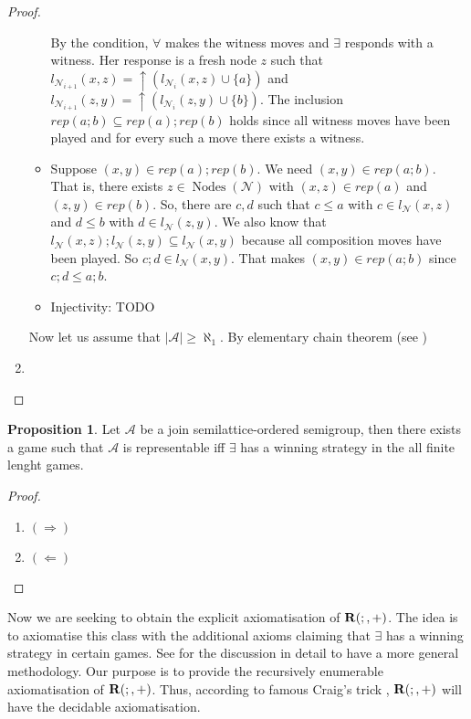 \documentclass[a4paper]{article}
\theoremstyle{definition}
\theoremstyle{theorem}
\theoremstyle{proposition}
\newtheorem{proposition}{Proposition}
\theoremstyle{lemma}
\theoremstyle{ex}
\theoremstyle{corollary}
\theoremstyle{claim}
\begin{document}
\begin{proof}
\begin{enumerate}
\begin{itemize}
By the condition, $\forall$ makes the witness moves and $\exists$ responds with a witness. Her response is a fresh node $z$ such that $l_{\mathcal{N}_{i + 1}}(x, z) =  \uparrow (l_{\mathcal{N}_i}(x, z) \cup \{ a \})$ and $l_{\mathcal{N}_{i + 1}}(z, y) = \uparrow (l_{\mathcal{N}_i}(z, y) \cup \{ b\})$. The inclusion $rep(a ; b) \subseteq rep(a) ; rep(b)$ holds since all witness moves have been played and for every such a move there exists a witness.

\item Suppose $(x, y) \in rep(a) ; rep(b)$. We need $(x, y) \in rep(a;b)$. That is, there exists $z \in \operatorname{Nodes}(\mathcal{N})$ with $(x, z) \in rep(a)$ and $(z, y) \in rep(b)$. So, there are $c, d$ such that $c \leq a$ with $c \in l_{\mathcal{N}}(x, z)$ and $d \leq b$ with $d \in l_{\mathcal{N}}(z, y)$.
We also know that $l_{\mathcal{N}}(x, z) ; l_{\mathcal{N}}(z, y) \subseteq l_{\mathcal{N}}(x, y)$ because all composition moves have been played.
So $c ; d \in l_{\mathcal{N}}(x, y)$. That makes $(x, y) \in rep(a;b)$ since $c ; d \leq a ; b$.

\item Injectivity: TODO

\end{itemize}
Now let us assume that $|\mathcal{A}| \geq \aleph_1$. By elementary chain theorem (see \cite[Theorem 2.5.2]{hodges1997shorter})

\item
  \end{enumerate}
\end{proof}

\begin{proposition}
  Let $\mathcal{A}$ be a join semilattice-ordered semigroup, then there exists a game such that $\mathcal{A}$ is representable iff $\exists$ has a winning strategy in the all finite lenght games.
\end{proposition}

\begin{proof}
$ $

  \begin{enumerate}
    \item $(\Rightarrow)$
    \item $(\Leftarrow)$
  \end{enumerate}
\end{proof}

Now we are seeking to obtain the explicit axiomatisation of ${\bf R}(;, +)$. The idea is to axiomatise this class with the additional axioms claiming that $\exists$ has a winning strategy in certain games. See \cite[Chapter 9]{hirsch2002relation} for the discussion in detail to have a more general methodology. Our purpose is to provide the recursively enumerable axiomatisation of ${\bf R}(;, +)$. Thus, according to famous Craig's trick \cite{craig1953axiomatizability}, ${\bf R}(;, +)$ will have the decidable axiomatisation.
\end{document}
